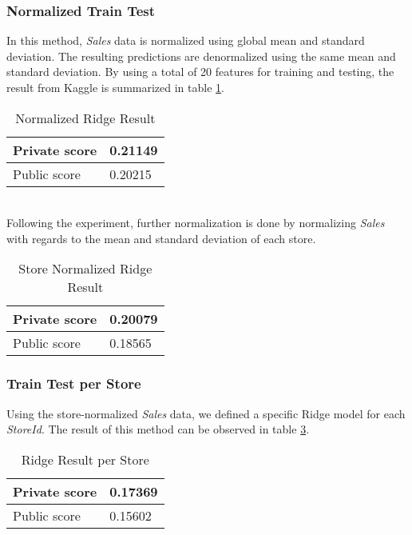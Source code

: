 \subsubsection{Normalized Train Test}
In this method, \textit{Sales} data is normalized using global mean and standard deviation. The resulting predictions are denormalized using the same mean and standard deviation.
By using a total of 20 features for training and testing, the result from Kaggle is summarized in table \ref{tab:ridge_norm_result}.
\begin{table}[h]
	\centering
	\caption{Normalized Ridge Result}
	\label{tab:ridge_norm_result}
	\begin{tabular}{|m{100pt}|m{50pt}|}
		\hline
		Private score & 0.21149 \\ \hline
		Public score  & 0.20215 \\ \hline
	\end{tabular}
\end{table}
\\
Following the experiment, further normalization is done by normalizing \textit{Sales} with regards to the mean and standard deviation of each store.
\begin{table}[h]
	\centering
	\caption{Store Normalized Ridge Result}
	\label{tab:ridge_norm_result_2}
	\begin{tabular}{|m{100pt}|m{50pt}|}
		\hline
		Private score & 0.20079 \\ \hline
		Public score  & 0.18565 \\ \hline
	\end{tabular}
\end{table}

\subsubsection{Train Test per Store}
Using the store-normalized \textit{Sales} data, we defined a specific Ridge model for each \textit{StoreId}. The result of this method can be observed in table \ref{tab:ridge_per_store_result}.
\begin{table}[h]
	\centering
	\caption{Ridge Result per Store}
	\label{tab:ridge_per_store_result}
	\begin{tabular}{|m{100pt}|m{50pt}|}
		\hline
		Private score & 0.17369 \\ \hline
		Public score  & 0.15602 \\ \hline
	\end{tabular}
\end{table}

